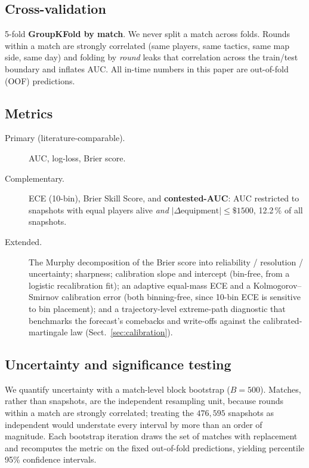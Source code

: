 \documentclass[11pt,a4paper]{article}
\begin{document}
\subsection{Cross-validation}
5-fold \textbf{GroupKFold by match}. We never split a match across folds. Rounds within a
match are strongly correlated (same players, same tactics, same map side, same day) and folding by \emph{round} leaks that correlation across the train/test boundary and
inflates AUC. All in-time numbers in this paper are out-of-fold (OOF) predictions.

\subsection{Metrics}
\begin{description}
  \item[Primary (literature-comparable).] AUC, log-loss, Brier score.
  \item[Complementary.] ECE (10-bin), Brier Skill Score, and \textbf{contested-AUC}: AUC
    restricted to snapshots with equal players alive \emph{and}
    $|\Delta\text{equipment}| \le \$1500$, 12.2\,\% of all snapshots.
  \item[Extended.] The Murphy decomposition of the Brier score into
    reliability / resolution / uncertainty; sharpness; calibration slope and intercept
    (bin-free, from a logistic recalibration fit); an adaptive equal-mass ECE and a
    Kolmogorov--Smirnov calibration error (both binning-free, since 10-bin ECE is sensitive
    to bin placement); and a trajectory-level extreme-path diagnostic that benchmarks the forecast's
    comebacks and write-offs against the calibrated-martingale law (Sect.~\ref{sec:calibration}).
\end{description}

\subsection{Uncertainty and significance testing}
\label{sec:significance}
We quantify uncertainty with a match-level block bootstrap ($B = 500$). Matches, rather
than snapshots, are the independent resampling unit, because rounds within a match are
strongly correlated; treating the $476{,}595$ snapshots as independent would understate
every interval by more than an order of magnitude. Each bootstrap iteration draws the set
of matches with replacement and recomputes the metric on the fixed out-of-fold
predictions, yielding percentile 95\% confidence intervals.
\end{document}
